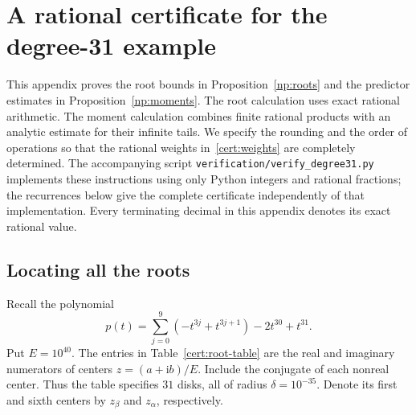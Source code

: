 \section{A rational certificate for the degree-31 example}
\label{cert:section}

This appendix proves the root bounds in Proposition~\ref{np:roots} and
the predictor estimates in Proposition~\ref{np:moments}.  The root
calculation uses exact rational arithmetic.  The moment calculation
combines finite rational products with an analytic estimate for their
infinite tails.  We specify the rounding and the order of operations so
that the rational weights in~\eqref{cert:weights} are completely determined.
The accompanying script \texttt{verification/verify\_degree31.py} implements
these instructions using only Python integers and rational fractions;
the recurrences below give the complete certificate independently of
that implementation.  Every terminating decimal in this appendix
denotes its exact rational value.

\subsection{Locating all the roots}
\label{cert:roots}\label{cert:root-proof}

Recall the polynomial
\[
 p(t)=\sum_{j=0}^{9}(-t^{3j}+t^{3j+1})-2t^{30}+t^{31}.
\]
Put $E=10^{40}$.  The entries in Table~\ref{cert:root-table} are the real
and imaginary numerators of centers $z=(a+\mathrm i b)/E$.
Include the conjugate of each nonreal center.  Thus the table specifies
$31$ disks, all of radius $\delta=10^{-35}$.
Denote its first and sixth centers by $z_\beta$ and $z_\alpha$,
respectively.

